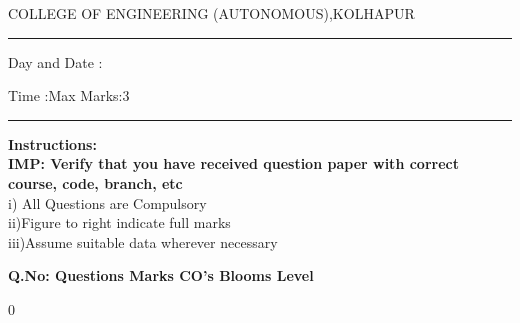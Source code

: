 \documentclass[12pt]{article}
\begin{document}
	
\par
COLLEGE OF ENGINEERING (AUTONOMOUS),KOLHAPUR
\par\noindent\rule{\textwidth}{0.4pt}

\centering{}\par
{}\par
\begin{flushleft}
Day and Date :
\end{flushleft}

\begin{flushleft}
Time :\hspace{3cm}Max Marks:{3}\\
\end{flushleft}
\noindent\rule{\textwidth}{0.1pt}
\begin{flushleft}
{\bf Instructions:}\\
{\hspace{0.5cm} \bf IMP: Verify that you have received question paper with correct course, code, branch, etc}\\
\hspace{1cm}i) All Questions are Compulsory\\
\hspace{1cm}ii)Figure to right indicate full marks\\
\hspace{1cm}iii)Assume suitable data wherever necessary\\
\end{flushleft} 

\begin{flushleft}
{\bf Q.No: \hspace{2.5cm} \bf Questions \hspace{0.25cm} \bf Marks \hspace{0.25cm} \bf CO's\hspace{0.25cm} \bf Blooms Level}	
\end{flushleft}

\begin{flushleft}

\end{flushleft}
\begin{flushleft}
0\par
\end{flushleft}

 
\end{document}
